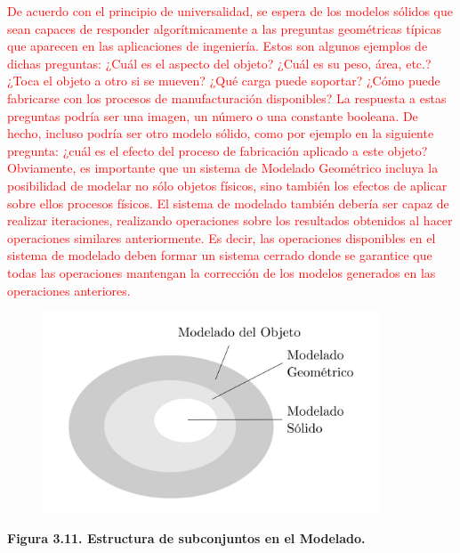 \textcolor{red}{De acuerdo con el principio de universalidad, se espera de los modelos sólidos que sean capaces de responder algorítmicamente a las preguntas geométricas típicas que aparecen en las aplicaciones de ingeniería. Estos son algunos
ejemplos de dichas preguntas:
¿Cuál es el aspecto del objeto? ¿Cuál es su peso, área, etc.? ¿Toca el objeto a otro
si se mueven? ¿Qué carga puede soportar? ¿Cómo puede fabricarse con los procesos de
manufacturación disponibles?
La respuesta a estas preguntas podría ser una imagen, un número o una constante booleana. De hecho, incluso podría ser otro modelo sólido,
como por ejemplo en la siguiente pregunta: ¿cuál es el efecto del proceso de fabricación aplicado a este objeto? Obviamente, es importante que un sistema
de Modelado Geométrico incluya la posibilidad de modelar no sólo objetos físicos, sino también los efectos de aplicar sobre ellos procesos físicos. El sistema de modelado también debería ser capaz de realizar iteraciones, realizando
operaciones sobre los resultados obtenidos al hacer operaciones similares
anteriormente. Es decir, las operaciones disponibles en el sistema de
modelado deben formar un sistema cerrado donde se garantice que todas las operaciones mantengan la corrección de los modelos generados en las operaciones anteriores.
}

\begin{figure}[h]
\includegraphics[width=10cm]{Img/GEO/geo-modelado0.jpg}
\centering
\end{figure}

\begin{center}
\textbf{Figura 3.11. \footnotesize{Estructura de subconjuntos en el Modelado.}}
\end{center}



